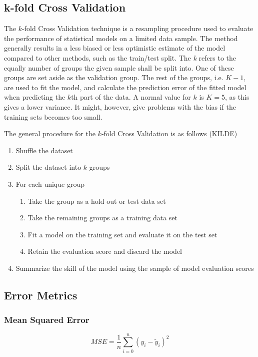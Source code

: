 \documentclass{article}
\begin{document}
\subsection{k-fold Cross Validation}
The $k$-fold Cross Validation technique is a resampling procedure used to evaluate the performance of statistical models on a limited data sample. The method generally results in a less biased or less optimistic estimate of the model compared to other methods, such as the train/test split. The \textit{k} refers to the equally number of groups the given sample shall be split into. One of these groups are set aside as the validation group. The rest of the groups, i.e. $K-1$, are used to fit the model, and calculate the prediction error of the fitted model when predicting the $k$th part of the data. A normal value for $k$ is $K=5$, as this gives a lower variance. It might, however, give problems with the bias if the training sets becomes too small.

The general procedure for the $k$-fold Cross Validation is as follows (KILDE)
\begin{enumerate}
\item Shuffle the dataset
\item Split the dataset into $k$ groups
\item For each unique group
\begin{enumerate}
\item Take the group as a hold out or test data set
\item Take the remaining groups as a training data set
\item Fit a model on the training set and evaluate it on the test set
\item Retain the evaluation score and discard the model
\end{enumerate}
	
\item Summarize the skill of the model using the sample of model evaluation scores
\end{enumerate}

\subsection{Error Metrics}
\subsubsection{Mean Squared Error}
\begin{equation}
MSE = \frac{1}{n} \sum_{i=0}^{n}(y_{i} - \tilde{y}_{i})^{2}
\end{equation}
\end{document}
